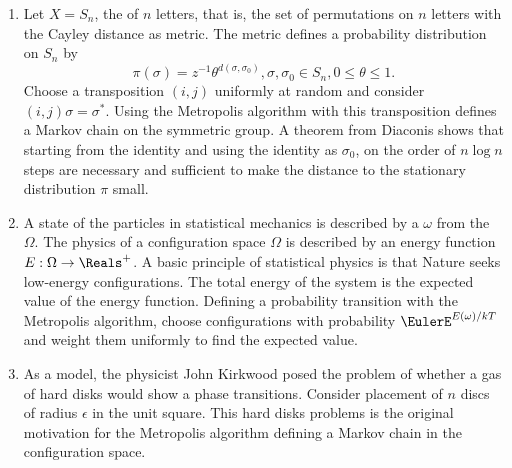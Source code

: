 \documentclass[12pt]{article}
\begin{document}
\begin{enumerate}
    \item
        Let \( X = S_n \), the  of \( n \)
        letters, that is, the set of permutations on \( n \) letters
        with the Cayley distance as metric.  The metric defines a
        probability distribution on \( S_n \) by
        \[
            \pi(\sigma) = z^{-1}\theta^{d(\sigma,\sigma_0)}, \sigma,
            \sigma_0 \in S_n, 0 \le \theta \le 1.
        \] Choose a transposition \( (i,j) \) uniformly at random and
        consider \( (i,j)\sigma = \sigma^{*} \).  Using the Metropolis
        algorithm with this transposition defines a Markov chain on the
        symmetric group.  A theorem from Diaconis
        \cite{diaconis98, diaconis81} shows that starting from the
        identity and using the identity as \( \sigma_0 \), on the order
        of \( n \log n \) steps are necessary and sufficient to make the
        distance to the stationary distribution \( \pi \) small.
    \item
        A state of the particles in statistical mechanics is described
        by a  \( \omega \) from the  \( \Omega \).  The physics of a configuration space \(
        \Omega \) is described by an energy function \( E:  \Omega \to
        \Reals^+ \).  A basic principle of statistical physics is that
        Nature seeks low-energy configurations.  The total energy of the
        system is the expected value of the energy function.  Defining a
        probability transition with the Metropolis algorithm, choose
        configurations with probability \( \EulerE^{E(\omega)/kT} \) and
        weight them uniformly to find the expected value.
    \item
        As a model, the physicist John Kirkwood posed the problem of
        whether a gas of hard disks would show a phase transitions.
        Consider placement of \( n \) discs of radius \( \epsilon \) in
        the unit square.  This hard disks problems is the original
        motivation for the Metropolis algorithm defining a Markov chain
        in the configuration space.
\end{enumerate}

\hr

\end{document}
